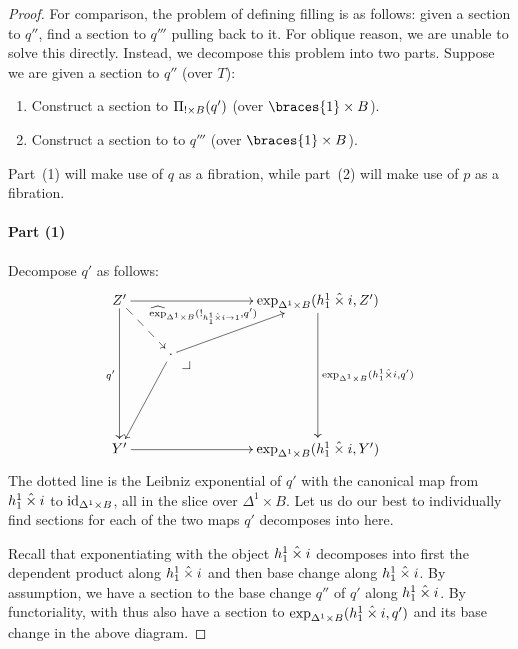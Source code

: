 \documentclass[reqno,10pt,a4paper,oneside]{amsart}
\begin{document}
\begin{proof}
For comparison, the problem of defining filling is as follows: given a section to $q''$, find a section to $q'''$ pulling back to it.
For oblique reason, we are unable to solve this directly.
Instead, we decompose this problem into two parts.
Suppose we are given a section to $q''$ (over $T$):
\begin{enumerate}
\item Construct a section to $\Pi_{\mathord{!} \times B}(q')$ (over $\braces{1} \times B$).
\item Construct a section to to $q'''$ (over $\braces{1} \times B$).
\end{enumerate}
Part~(1) will make use of $q$ as a fibration, while part~(2) will make use of $p$ as a fibration.

\paragraph{Part (1)}

Decompose $q'$ as follows:
\[
\xymatrix{
  Z'
  \ar[rrr]
  \ar[ddd]_{q'}
  \ar@{-->}[dr]^{\hatexp_{\Delta^1 \times B}(\canonical_{h_1^1 \hattimes i \to 1}, q')}
&&&
  \ar[ddd]^{\exp_{\Delta^1 \times B}(h_1^1 \hattimes i, q')}
  \exp_{\Delta^1 \times B}(h_1^1 \hattimes i, Z')
\\&
  \arghole
  \ar[ddl]
  \ar[urr]
  \pullback{dr}
\\\\
  Y'
  \ar[rrr]
&&&
  \exp_{\Delta^1 \times B}(h_1^1 \hattimes i, Y')
}
\]
The dotted line is the Leibniz exponential of $q'$ with the canonical map from $h_1^1 \mathbin{\hat{\times}} i$ to $\operatorname{id}_{\Delta^1 \times B}$, all in the slice over $\Delta^1 \times B$.
Let us do our best to individually find sections for each of the two maps $q'$ decomposes into here.

Recall that exponentiating with the object $h_1^1 \mathbin{\hat{\times}} i$ decomposes into first the dependent product along $h_1^1 \mathbin{\hat{\times}} i$ and then base change along $h_1^1 \mathbin{\hat{\times}} i$.
By assumption, we have a section to the base change $q''$ of $q'$ along $h_1^1 \mathbin{\hat{\times}} i$.
By functoriality, with thus also have a section to $\exp_{\Delta^1 \times B}(h_1^1 \mathbin{\hat{\times}} i, q')$ and its base change in the above diagram.


\end{proof}
\end{document}
